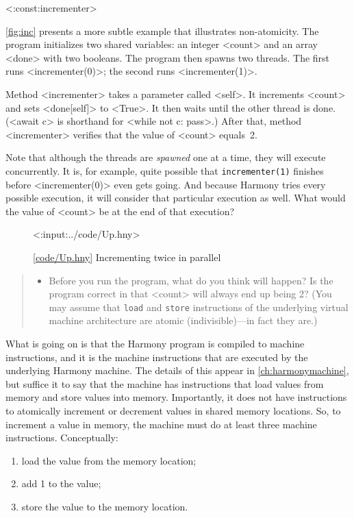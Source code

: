 \documentclass{report}
\newcommand{\harmonylink}[1]{%
[\href{https://harmony.cs.cornell.edu/#1}{\underline{#1}}]%
}
\newenvironment{code}{
\tcolorbox
}{
\endtcolorbox
}
\begin{document}
<{:const:incrementer}>

\autoref{fig:inc} presents a more subtle example that illustrates
non-atomicity.
The program initializes two shared variables:
an integer <{count}> and
an array <{done}> with two booleans.
The program then spawns two threads.
The first runs <{incrementer(0)}>; the second runs <{incrementer(1)}>.

Method <{incrementer}> takes a parameter called <{self}>.
It increments <{count}> and sets <{done[self]}> to <{True}>.
It then waits until the other thread is done.
(<{await c}> is shorthand for <{while not c: pass}>.)
After that, method <{incrementer}>
verifies that the value of <{count}> equals~2.

Note that although the threads are \emph{spawned} one at a time,
they will execute concurrently.  It is, for example, quite possible
that \texttt{incrementer(1)} finishes before <{incrementer(0)}>
even gets going.
And because Harmony tries every possible execution, it will consider
that particular execution as well.
What would the value of <{count}> be at the end of that execution?

\begin{figure}[h]
\begin{code}
<{:input:../code/Up.hny}>
\end{code}
\caption{\harmonylink{code/Up.hny} Incrementing twice in parallel}
\label{fig:inc}
\end{figure}

\begin{quote}
\begin{itemize}
\item Before you run the program, what do you think will happen?  Is the
program correct in that <{count}> will always end up being 2?
(You may assume that \texttt{load} and \texttt{store} instructions of the
underlying virtual machine architecture are atomic (indivisible)---in fact
they are.)
\end{itemize}
\end{quote}

%

What is going on is that the Harmony program is compiled to machine instructions,
%
and it is the machine instructions that are executed by the underlying Harmony
machine.  The details of this appear in \autoref{ch:harmonymachine},
but suffice it to
say that the machine has instructions that load values from memory and store
values into memory.  Importantly, it does not have instructions to atomically
increment or decrement values in shared memory locations.
So, to increment a value in memory,
the machine must do at least three machine instructions.  Conceptually:
\begin{enumerate}
\item load the value from the memory location;
\item add 1 to the value;
\item store the value to the memory location.
\end{enumerate}
\end{document}

